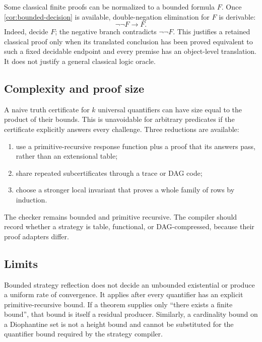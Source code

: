 Some classical finite proofs can be normalized to a bounded formula \(F\).  Once \cref{cor:bounded-decision} is available, double-negation elimination for \(F\) is derivable:
\[
                     \neg\neg F\longrightarrow F.
\]
Indeed, decide \(F\); the negative branch contradicts \(\neg\neg F\).  This justifies a retained classical proof only when its translated conclusion has been proved equivalent to such a fixed decidable endpoint and every premise has an object-level translation.  It does not justify a general classical logic oracle.

\subsection{Complexity and proof size}

A naive truth certificate for \(k\) universal quantifiers can have size equal to the product of their bounds.  This is unavoidable for arbitrary predicates if the certificate explicitly answers every challenge.  Three reductions are available:
\begin{enumerate}
  \item use a primitive-recursive response function plus a proof that its answers pass, rather than an extensional table;
  \item share repeated subcertificates through a trace or DAG code;
  \item choose a stronger local invariant that proves a whole family of rows by induction.
\end{enumerate}
The checker remains bounded and primitive recursive.  The compiler should record whether a strategy is table, functional, or DAG-compressed, because their proof adapters differ.

\subsection{Limits}

Bounded strategy reflection does not decide an unbounded existential or produce a uniform rate of convergence.  It applies after every quantifier has an explicit primitive-recursive bound.  If a theorem supplies only ``there exists a finite bound'', that bound is itself a residual producer.  Similarly, a cardinality bound on a Diophantine set is not a height bound and cannot be substituted for the quantifier bound required by the strategy compiler.
